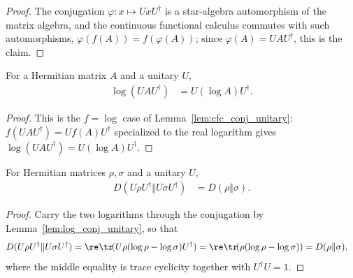 \begin{proof}\leanok
    The conjugation $\varphi:x\mapsto UxU^\dagger$ is a star-algebra
    automorphism of the matrix algebra, and the continuous functional calculus
    commutes with such automorphisms, $\varphi(f(A))=f(\varphi(A))$; since
    $\varphi(A)=UAU^\dagger$, this is the claim.
\end{proof}

\begin{lemma}
    \label{lem:log_conj_unitary}
    \leanok
    For a Hermitian matrix $A$ and a unitary $U$,
    \begin{align}
        \log(UAU^\dagger)
         & =U(\log A)U^\dagger.
        \label{eq:entropy_log_conjugation}
    \end{align}
\end{lemma}

\begin{proof}\leanok
    This is the $f=\log$ case of Lemma~\ref{lem:cfc_conj_unitary}:
    $f(UAU^\dagger)=Uf(A)U^\dagger$ specialized to the real logarithm gives
    $\log(UAU^\dagger)=U(\log A)U^\dagger$.
\end{proof}

\begin{theorem}
    \label{thm:relative_entropy_unitary_invariance}
    \leanok
    For Hermitian matrices $\rho,\sigma$ and a unitary $U$,
    \begin{align}
        D(U\rho U^\dagger\Vert U\sigma U^\dagger)
         & =D(\rho\Vert\sigma).
        \label{eq:entropy_unitary_invariance}
    \end{align}
\end{theorem}

\begin{proof}\leanok
    Carry the two logarithms through the conjugation by
    Lemma~\ref{lem:log_conj_unitary}, so that
    \begin{align}
        D(U\rho U^\dagger\Vert U\sigma U^\dagger)
         & =\re\tr\!(U\rho(\log\rho-\log\sigma)U^\dagger)
        =\re\tr\!(\rho(\log\rho-\log\sigma))
        =D(\rho\Vert\sigma),
        \notag
    \end{align}
    where the middle equality is trace cyclicity together with
    $U^\dagger U=1$.
\end{proof}

